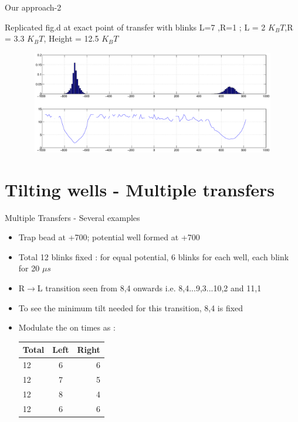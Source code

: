 \documentclass{beamer}
\begin{document}
\begin{frame}{Our approach-2} 

Replicated fig.d at exact point of transfer with blinks L=7 ,R=1 ; L = 2 $K_BT$,R = 3.3 $K_BT$, Height = 12.5 $K_BT$
\begin{figure}
    \centering
    \includegraphics[height=4.5cm,width=12cm]{I4k_transfer_wells_6.eps}
   
\end{figure}


\end{frame}

\section{Tilting wells - Multiple transfers}
\begin{frame}{Multiple Transfers - Several examples} 

\begin{itemize}

\item Trap bead at +700; potential well formed at +700
\item Total 12 blinks fixed : for equal potential, 6 blinks for each well, each blink for 20 $\mu s$
\item R$\rightarrow$L transition seen from 8,4 onwards i.e. 8,4...9,3...10,2 and 11,1
\item To see the minimum tilt needed for this transition, 8,4 is fixed
\item Modulate the on times as :

\begin{center} 
\begin{tabular}{| l | c | r |} 
\hline Total & Left & Right \\ 
\hline 12 & 6 & 6 \\ 
\hline 12 & 7 & 5 \\ 
\hline 12 & 8 & 4 \\ 
\hline \hline 12 & 6 & 6 \\ 
\hline \end{tabular} 
\end{center}

\end{itemize}

\end{frame}
\end{document}
